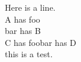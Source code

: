 \documentclass[12pt]{article}
\begin{document}
  Here is a line. \\
  {A has foo} \\
  {bar has B} \\
  {C has foobar has D} \\
  this is a test.
\end{document}
